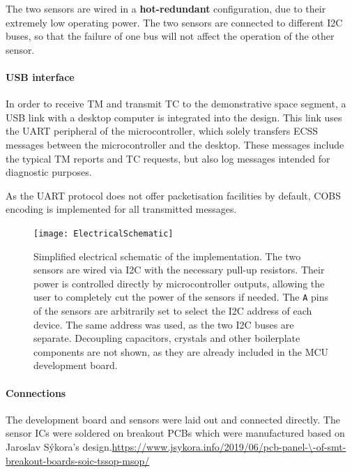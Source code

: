 \documentclass[a4paper,nobib]{tufte-book}
\begin{document}

The two sensors are wired in a \textbf{hot-redundant} configuration, due to their extremely low operating power. The two sensors are connected to different \ac{I2C} buses, so that the failure of one bus will not affect the operation of the other sensor.

\paragraph{\acs{USB} interface} In order to receive \acl{TM} and transmit \acl{TC} to the demonstrative space segment, a \acs{USB} link with a desktop computer is integrated into the design. This link uses the \acs{UART} peripheral of the microcontroller, which solely transfers \acs{ECSS} messages between the microcontroller and the desktop. These messages include the typical \acs{TM} reports and \acs{TC} requests, but also log messages intended for diagnostic purposes.

As the \acs{UART} protocol does not offer packetisation facilities by default, \ac{COBS} encoding \autocite{cheshire_consistent_overhead_1997} is implemented for all transmitted messages.

\begin{figure}[h]
	\texttt{[image: ElectricalSchematic]}
	\caption[Simplified electrical schematic of the implementation]{Simplified electrical schematic of the implementation. The two sensors are wired via \ac{I2C} with the necessary pull-up resistors. Their power is controlled directly by microcontroller outputs, allowing the user to completely cut the power of the sensors if needed. The \texttt{A} pins of the sensors are arbitrarily set to select the \ac{I2C} address of each device. The same address was used, as the two \ac{I2C} buses are separate. Decoupling capacitors, crystals and other boilerplate components are not shown, as they are already included in the \ac{MCU} development board.}
	\label{fig:schematic}
\end{figure}

\paragraph{Connections}
The development board and sensors were laid out and connected directly. The sensor \acp{IC} were soldered on breakout \acp{PCB} which were manufactured based on Jaroslav Sýkora's design.\url{https://www.jsykora.info/2019/06/pcb-panel-\-of-smt-breakout-boards-soic-tssop-msop/}
\end{document}
